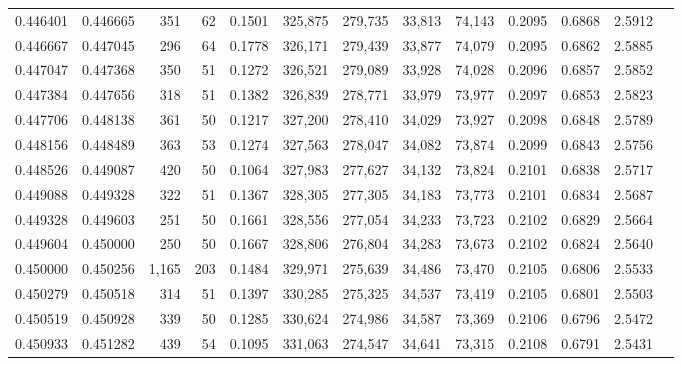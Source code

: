 \begin{tabular}{rrrrrrrrrrrrr}
0.446401 & 0.446665 &    351 &    62 &                                     0.1501 & 325,875 & 279,735 &  33,813 &  74,143 & 0.2095 & 0.6868 & 2.5912 \\
0.446667 & 0.447045 &    296 &    64 &                                     0.1778 & 326,171 & 279,439 &  33,877 &  74,079 & 0.2095 & 0.6862 & 2.5885 \\
0.447047 & 0.447368 &    350 &    51 &                                     0.1272 & 326,521 & 279,089 &  33,928 &  74,028 & 0.2096 & 0.6857 & 2.5852 \\
0.447384 & 0.447656 &    318 &    51 &                                     0.1382 & 326,839 & 278,771 &  33,979 &  73,977 & 0.2097 & 0.6853 & 2.5823 \\
0.447706 & 0.448138 &    361 &    50 &                                     0.1217 & 327,200 & 278,410 &  34,029 &  73,927 & 0.2098 & 0.6848 & 2.5789 \\
0.448156 & 0.448489 &    363 &    53 &                                     0.1274 & 327,563 & 278,047 &  34,082 &  73,874 & 0.2099 & 0.6843 & 2.5756 \\
0.448526 & 0.449087 &    420 &    50 &                                     0.1064 & 327,983 & 277,627 &  34,132 &  73,824 & 0.2101 & 0.6838 & 2.5717 \\
0.449088 & 0.449328 &    322 &    51 &                                     0.1367 & 328,305 & 277,305 &  34,183 &  73,773 & 0.2101 & 0.6834 & 2.5687 \\
0.449328 & 0.449603 &    251 &    50 &                                     0.1661 & 328,556 & 277,054 &  34,233 &  73,723 & 0.2102 & 0.6829 & 2.5664 \\
0.449604 & 0.450000 &    250 &    50 &                                     0.1667 & 328,806 & 276,804 &  34,283 &  73,673 & 0.2102 & 0.6824 & 2.5640 \\
0.450000 & 0.450256 &  1,165 &   203 &                                     0.1484 & 329,971 & 275,639 &  34,486 &  73,470 & 0.2105 & 0.6806 & 2.5533 \\
0.450279 & 0.450518 &    314 &    51 &                                     0.1397 & 330,285 & 275,325 &  34,537 &  73,419 & 0.2105 & 0.6801 & 2.5503 \\
0.450519 & 0.450928 &    339 &    50 &                                     0.1285 & 330,624 & 274,986 &  34,587 &  73,369 & 0.2106 & 0.6796 & 2.5472 \\
0.450933 & 0.451282 &    439 &    54 &                                     0.1095 & 331,063 & 274,547 &  34,641 &  73,315 & 0.2108 & 0.6791 & 2.5431 \\

\end{tabular}
